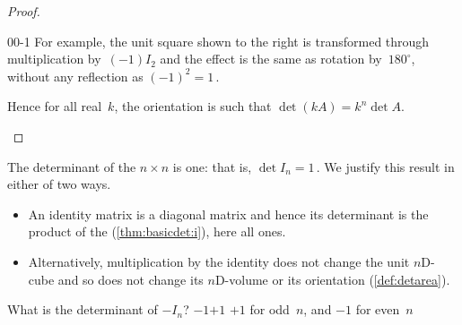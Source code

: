 \begin{proof}
\begin{description}
\begin{figbox}{00{-1}}%
For example, the unit square shown to the right is transformed through multiplication by~\((-1)I_2\) and the effect is the same as rotation by~\(180^\circ\), without any reflection as \((-1)^2=1\)\,.

Hence for all real~\(k\), the orientation is such that \(\det(kA)=k^n\det A\). 
\end{figbox}
\end{description}
\end{proof}




\begin{example} \label{eg:detident}
The determinant of the \(n\times n\)  is one: that is, \(\det I_n=1\)\,. 
We justify this result in either of two ways.
\begin{itemize}
\item An identity matrix is a diagonal matrix and hence its determinant is the product of the  (\cref{thm:basicdet:i}), here all ones. 
\item Alternatively, multiplication by the identity does not change the unit $n$D-cube and so does not change its $n$D-volume or its orientation (\cref{def:detarea}).
\aqed

\end{itemize}
\end{example}





\begin{activity}
What is the determinant of \(-I_n\)?
{\(-1\)}{\(+1\)}
{\(+1\) for odd~\(n\), and \(-1\) for even~\(n\)}
\end{activity}






